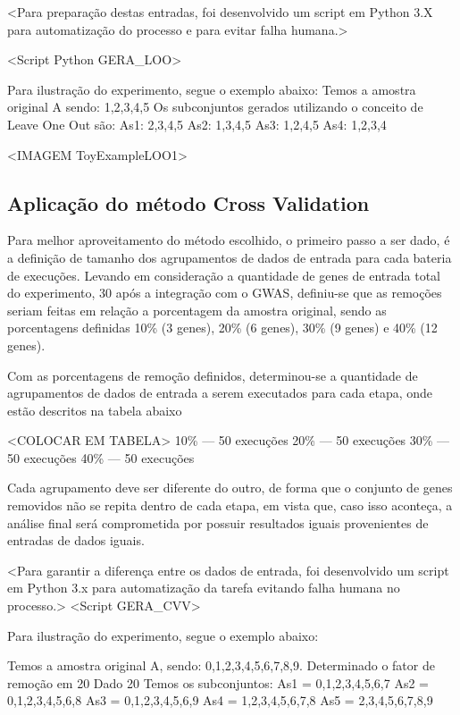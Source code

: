 <Para preparação destas entradas, foi desenvolvido um script em Python 3.X para automatização do processo e para evitar falha humana.>

<Script Python GERA_LOO>

Para ilustração do experimento, segue o exemplo abaixo:
Temos a amostra original A sendo: 1,2,3,4,5
Os subconjuntos gerados utilizando o conceito de Leave One Out são:
As1: 2,3,4,5
As2: 1,3,4,5
As3: 1,2,4,5
As4: 1,2,3,4

<IMAGEM ToyExampleLOO1>

\subsection{Aplicação do método Cross Validation}

Para melhor aproveitamento do método escolhido, o primeiro passo a ser dado, é a definição de tamanho dos agrupamentos de dados de entrada para cada bateria de execuções.
Levando em consideração a quantidade de genes de entrada total do experimento, 30 após a integração com o GWAS, definiu-se que as remoções seriam feitas em relação a porcentagem da amostra original, sendo as porcentagens definidas 10\% (3 genes), 20\% (6 genes), 30\% (9 genes) e 40\% (12 genes).

Com as porcentagens de remoção definidos, determinou-se a quantidade de agrupamentos de dados de entrada a serem executados para cada etapa, onde estão descritos na tabela abaixo

<COLOCAR EM TABELA>
10\% --- 50 execuções
20\% --- 50 execuções
30\% --- 50 execuções
40\% --- 50 execuções

Cada agrupamento deve ser diferente do outro, de forma que o conjunto de genes removidos não se repita dentro de cada etapa, em vista que, caso isso aconteça, a análise final será comprometida por possuir resultados iguais provenientes de entradas de dados iguais.

<Para garantir a diferença entre os dados de entrada, foi desenvolvido um script em Python 3.x para automatização da tarefa evitando falha humana no processo.>
<Script GERA_CVV>

Para ilustração do experimento, segue o exemplo abaixo:

Temos a amostra original A, sendo: 0,1,2,3,4,5,6,7,8,9.
Determinado o fator de remoção em 20%
Dado 20%
Temos os subconjuntos:
As1 = 0,1,2,3,4,5,6,7
As2 = 0,1,2,3,4,5,6,8
As3 = 0,1,2,3,4,5,6,9
As4 = 1,2,3,4,5,6,7,8
As5 = 2,3,4,5,6,7,8,9

